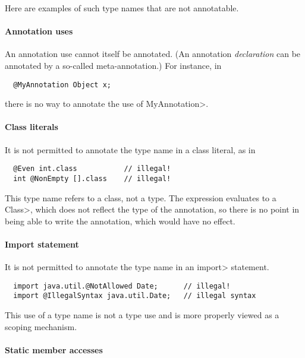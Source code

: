 \documentclass[10pt]{article}
\begin{document}
Here are examples of such type names that are not annotatable.

\paragraph{Annotation uses}
An annotation use cannot itself be annotated.  (An annotation \emph{declaration}
can be annotated by a so-called meta-annotation.)
For instance, in

\preverbnegspace
\begin{Verbatim}
  @MyAnnotation Object x;
\end{Verbatim}
\preverbnegspace

\noindent
there is no way to annotate the use of \<MyAnnotation>.

\paragraph{Class literals}
It is not permitted to annotate the type name in a class literal, as in

\preverbnegspace
\begin{Verbatim}
  @Even int.class           // illegal!
  int @NonEmpty [].class    // illegal!
\end{Verbatim}
\preverbnegspace

\noindent
This type name refers to a class, not a type.  The expression evaluates to a
\<Class>, which does not reflect the type of the annotation, so there is no
point in being able to write the annotation, which would have no effect.

\paragraph{Import statement}
It is not permitted to annotate the type name in an \<import> statement.

\preverbnegspace
\begin{Verbatim}
  import java.util.@NotAllowed Date;      // illegal!
  import @IllegalSyntax java.util.Date;   // illegal syntax
\end{Verbatim}
\preverbnegspace

\noindent
This use of a type name is not a type use and is more properly viewed as
a scoping mechanism.

\paragraph{Static member accesses}
\end{document}
